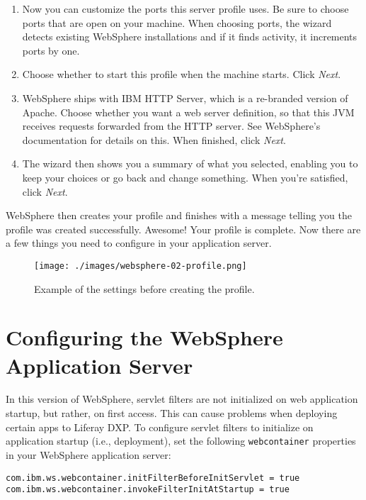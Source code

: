 \begin{enumerate}
\item
  Now you can customize the ports this server profile uses. Be sure to
  choose ports that are open on your machine. When choosing ports, the
  wizard detects existing WebSphere installations and if it finds
  activity, it increments ports by one.
\item
  Choose whether to start this profile when the machine starts. Click
  \emph{Next}.
\item
  WebSphere ships with IBM HTTP Server, which is a re-branded version of
  Apache. Choose whether you want a web server definition, so that this
  JVM receives requests forwarded from the HTTP server. See WebSphere's
  documentation for details on this. When finished, click \emph{Next}.
\item
  The wizard then shows you a summary of what you selected, enabling you
  to keep your choices or go back and change something. When you're
  satisfied, click \emph{Next}.
\end{enumerate}

WebSphere then creates your profile and finishes with a message telling
you the profile was created successfully. Awesome! Your profile is
complete. Now there are a few things you need to configure in your
application server.

\begin{figure}
\centering
\texttt{[image: ./images/websphere-02-profile.png]}
\caption{Example of the settings before creating the profile.}
\end{figure}

\section{Configuring the WebSphere Application
Server}\label{configuring-the-websphere-application-server}

In this version of WebSphere, servlet filters are not initialized on web
application startup, but rather, on first access. This can cause
problems when deploying certain apps to Liferay DXP. To configure
servlet filters to initialize on application startup (i.e., deployment),
set the following \texttt{webcontainer} properties in your WebSphere
application server:

\begin{verbatim}
com.ibm.ws.webcontainer.initFilterBeforeInitServlet = true
com.ibm.ws.webcontainer.invokeFilterInitAtStartup = true
\end{verbatim}


